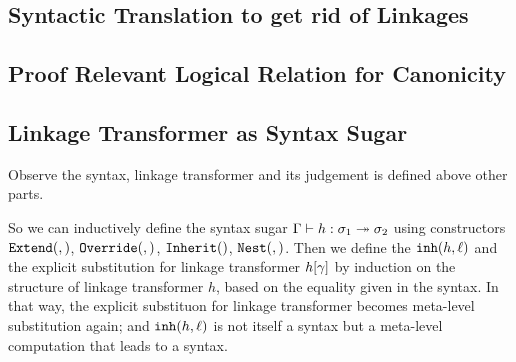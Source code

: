 






\subsection{Syntactic Translation to get rid of Linkages}




% 


\subsection{Proof Relevant Logical Relation for Canonicity}


\subsection{Linkage Transformer as Syntax Sugar}
Observe the syntax, linkage transformer and its judgement is defined above 
other parts. 

So we can inductively define the syntax sugar $ {\Gamma} \vdash {h} : {\sigma_1} \twoheadrightarrow {\ensuremath{\sigma}_2}$ using constructors $\texttt{Extend}({},{})$, $\texttt{Override}({},{})$, $\texttt{Inherit}({})$, $\texttt{Nest}({},{})$. Then we define the $\texttt{inh}({h},{\ell})$ and the explicit substitution for linkage transformer ${h}\!\left[{\gamma}\right]$ by induction on the structure of linkage transformer $h$, based on the equality
given in the syntax. In that way, the explicit substituon for linkage transformer becomes meta-level substitution again; and $\texttt{inh}({h},{\ell})$ is not itself a syntax but a meta-level computation that leads to a syntax.